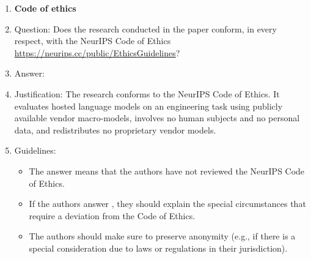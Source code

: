 \begin{enumerate}
\item {\bf Code of ethics}
    \item[] Question: Does the research conducted in the paper conform, in every respect, with the NeurIPS Code of Ethics \url{https://neurips.cc/public/EthicsGuidelines}?
        \item[] Answer: \answerYes{}
    \item[] Justification: The research conforms to the NeurIPS Code of
    Ethics. It evaluates hosted language models on an engineering task using
    publicly available vendor macro-models, involves no human subjects and no
    personal data, and redistributes no proprietary vendor models.
    \item[] Guidelines:
    \begin{itemize}
        \item The answer \answerNA{} means that the authors have not reviewed the NeurIPS Code of Ethics.
        \item If the authors answer \answerNo, they should explain the special circumstances that require a deviation from the Code of Ethics.
        \item The authors should make sure to preserve anonymity (e.g., if there is a special consideration due to laws or regulations in their jurisdiction).
    \end{itemize}



\end{enumerate}
